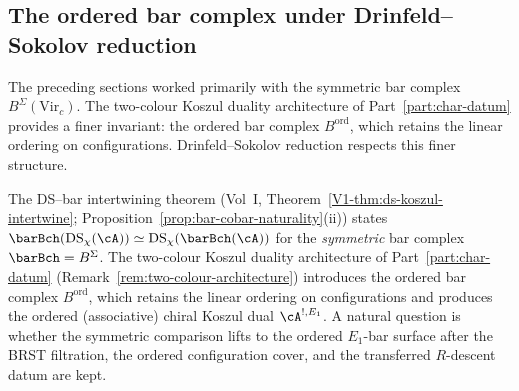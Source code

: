 
\subsection{The ordered bar complex under Drinfeld--Sokolov reduction}
\label{subsec:ds-ordered-bar}

The preceding sections worked primarily with the symmetric bar
complex $B^\Sigma(\mathrm{Vir}_c)$. The two-colour Koszul
duality architecture of Part~\ref{part:char-datum} provides a finer invariant:
the ordered bar complex $B^{\mathrm{ord}}$, which retains
the linear ordering on configurations. Drinfeld--Sokolov
reduction respects this finer structure.

The DS--bar intertwining theorem
(Vol~I, Theorem~\ref*{V1-thm:ds-koszul-intertwine};
Proposition~\ref{prop:bar-cobar-naturality}(ii))
states $\barBch(\mathrm{DS}_\chi(\cA))
\simeq \mathrm{DS}_\chi(\barBch(\cA))$ for the \emph{symmetric}
bar complex $\barBch = B^\Sigma$. The two-colour Koszul duality
architecture of Part~\ref{part:char-datum}
(Remark~\ref{rem:two-colour-architecture})
introduces the ordered bar complex $B^{\mathrm{ord}}$, which
retains the linear ordering on configurations and produces the
ordered (associative) chiral Koszul dual $\cA^{!,E_1}$.  A natural
question is whether the symmetric comparison lifts to the ordered
\(E_1\)-bar surface after the BRST filtration, the ordered
configuration cover, and the transferred \(R\)-descent datum are kept.

